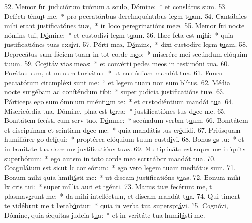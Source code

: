 52. Memor fui judiciórum tuórum a sculo, D\uline{ó}mine:~* et consl\uline{á}tus sum.
53. Defécti ténu\uline{i}t me,~* pro peccatóribus derelinquéntibus legm t\uline{u}am.
54. Cantábiles mihi erant justificatónes t\uline{u}æ,~* in loco peregrinatións m\uline{e}æ.
55. Memor fui nocte nómins tui, D\uline{ó}mine:~* et custodívi legm t\uline{u}am.
56. Hæc fcta est m\uline{i}hi:~* quia justificatiónes tuas exs\uline{í}vi.
57. Pórti mea, D\uline{ó}mine,~* dixi custodíre legm t\uline{u}am.
58. Deprecátus sum fáciem tuam in tot corde m\uline{e}o:~* miserére mei secúndum elóquim t\uline{u}um.
59. Cogitáv vias m\uline{e}as:~* et convérti pedes meos in testimóni t\uline{u}a.
60. Parátus sum, et nn sum turb\uline{á}tus:~* ut custódiam mandát t\uline{u}a.
61. Funes peccatórum circmpléxi s\uline{u}nt me:~* et legem tuam non sum bl\uline{í}tus.
62. Média nocte surgébam ad confténdum t\uline{i}bi:~* super judícia justificatións t\uline{u}æ.
63. Párticeps ego sum ómnium tménti\uline{u}m te:~* et custodiéntium mandát t\uline{u}a.
64. Misericórdia tua, Dómine, plna est t\uline{e}rra:~* justificatiónes tus d\uline{o}ce me.
65. Bonitátem fecísti cum serv tuo, D\uline{ó}mine:~* secúndum verbm t\uline{u}um.
66. Bonitátem et disciplínam et scintiam d\uline{o}ce me:~* quia mandátis tus cr\uline{é}didi.
67. Priúsquam humiliárer go del\uline{í}qui:~* proptérea elóquium tuum custd\uline{í}vi.
68. Bonus \uline{e}s tu:~* et in bonitáte tua doce me justificatións t\uline{u}as.
69. Multiplicáta est super me iníquits superb\uline{ó}rum:~* ego autem in toto corde meo scrutábor mandát t\uline{u}a.
70. Coagulátum est sicut lc cor e\uline{ó}rum:~* ego vero legem tuam medt\uline{á}tus sum.
71. Bonum mihi quia hmili\uline{á}sti me:~* ut discam justificatións t\uline{u}as.
72. Bonum mihi lx oris t\uline{u}i:~* super míllia auri et rg\uline{é}nti.
73. Manus tuæ fecérunt me, t plasmav\uline{é}runt me:~* da mihi intelléctum, et discam mandát t\uline{u}a.
74. Qui timent te vidébunt me t lætab\uline{ú}ntur:~* quia in verba tua superspr\uline{á}vi.
75. Cognóvi, Dómine, quia ǽquitas judcia t\uline{u}a:~* et in veritáte tua humil\uline{á}sti me.
